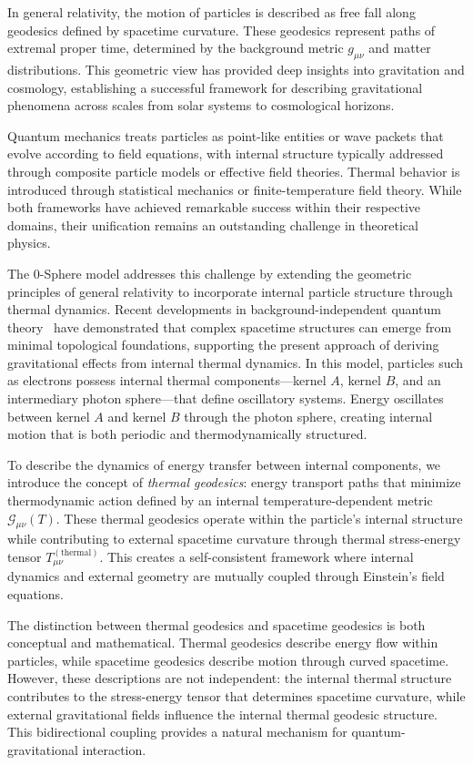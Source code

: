 \documentclass[%
 reprint,
 amsmath,amssymb,
 aps,
]{revtex4-1}
\numberwithin{equation}{section}%
\begin{document}
In general relativity, the motion of particles is described as free fall along geodesics defined by spacetime curvature. These geodesics represent paths of extremal proper time, determined by the background metric $g_{\mu\nu}$ and matter distributions. This geometric view has provided deep insights into gravitation and cosmology, establishing a successful framework for describing gravitational phenomena across scales from solar systems to cosmological horizons.

Quantum mechanics treats particles as point-like entities or wave packets that evolve according to field equations, with internal structure typically addressed through composite particle models or effective field theories. Thermal behavior is introduced through statistical mechanics or finite-temperature field theory. While both frameworks have achieved remarkable success within their respective domains, their unification remains an outstanding challenge in theoretical physics.

The 0-Sphere model addresses this challenge by extending the geometric principles of general relativity to incorporate internal particle structure through thermal dynamics. Recent developments in background-independent quantum theory~\cite{hanamura2507.0081} have demonstrated that complex spacetime structures can emerge from minimal topological foundations, supporting the present approach of deriving gravitational effects from internal thermal dynamics. In this model, particles such as electrons possess internal thermal components—kernel $A$, kernel $B$, and an intermediary photon sphere—that define oscillatory systems. Energy oscillates between kernel $A$ and kernel $B$ through the photon sphere, creating internal motion that is both periodic and thermodynamically structured.

To describe the dynamics of energy transfer between internal components, we introduce the concept of \textit{thermal geodesics}: energy transport paths that minimize thermodynamic action defined by an internal temperature-dependent metric $\mathcal{G}_{\mu\nu}(T)$. These thermal geodesics operate within the particle's internal structure while contributing to external spacetime curvature through thermal stress-energy tensor $T_{\mu\nu}^{(\text{thermal})}$. This creates a self-consistent framework where internal dynamics and external geometry are mutually coupled through Einstein's field equations.

The distinction between thermal geodesics and spacetime geodesics is both conceptual and mathematical. Thermal geodesics describe energy flow within particles, while spacetime geodesics describe motion through curved spacetime. However, these descriptions are not independent: the internal thermal structure contributes to the stress-energy tensor that determines spacetime curvature, while external gravitational fields influence the internal thermal geodesic structure. This bidirectional coupling provides a natural mechanism for quantum-gravitational interaction.
\end{document}

